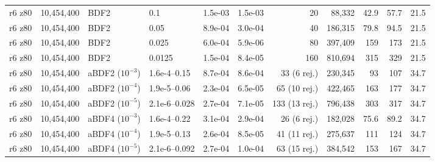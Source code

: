 \begin{longtable}{>{\footnotesize}l>{\footnotesize}r>{\footnotesize}l>{\footnotesize}l>{\footnotesize}r>{\footnotesize}r>{\footnotesize}r>{\footnotesize}r>{\footnotesize}r>{\footnotesize}r>{\footnotesize}r}
r6 z80 & 10,454,400 & BDF2 & 0.1 & 1.5e-03 & 1.5e-03 & 20 & 88,332 & 42.9 & 57.7 & 21.5 \\
r6 z80 & 10,454,400 & BDF2 & 0.05 & 8.9e-04 & 3.0e-04 & 40 & 186,315 & 79.8 & 94.5 & 21.5 \\
r6 z80 & 10,454,400 & BDF2 & 0.025 & 6.0e-04 & 5.9e-06 & 80 & 397,409 & 159 & 173 & 21.5 \\
r6 z80 & 10,454,400 & BDF2 & 0.0125 & 1.5e-04 & 8.4e-05 & 160 & 810,694 & 315 & 329 & 21.5 \\
r6 z80 & 10,454,400 & aBDF2 ($10^{-3}$) & 1.6e-4--0.15 & 8.7e-04 & 8.6e-04 & 33 (6 rej.) & 230,345 & 93 & 107 & 34.7 \\
r6 z80 & 10,454,400 & aBDF2 ($10^{-4}$) & 1.9e-5--0.06 & 2.3e-04 & 6.5e-05 & 65 (10 rej.) & 422,465 & 163 & 177 & 34.7 \\
r6 z80 & 10,454,400 & aBDF2 ($10^{-5}$) & 2.1e-6--0.028 & 2.7e-04 & 7.1e-05 & 133 (13 rej.) & 796,438 & 303 & 317 & 34.7 \\
r6 z80 & 10,454,400 & aBDF4 ($10^{-3}$) & 1.6e-4--0.22 & 3.1e-04 & 2.9e-04 & 26 (6 rej.) & 182,028 & 75.6 & 89.2 & 34.7 \\
r6 z80 & 10,454,400 & aBDF4 ($10^{-4}$) & 1.9e-5--0.13 & 2.6e-04 & 8.5e-05 & 41 (11 rej.) & 275,637 & 111 & 124 & 34.7 \\
r6 z80 & 10,454,400 & aBDF4 ($10^{-5}$) & 2.1e-6--0.092 & 2.7e-04 & 1.0e-04 & 63 (15 rej.) & 384,542 & 153 & 167 & 34.7 \\
\end{longtable}
